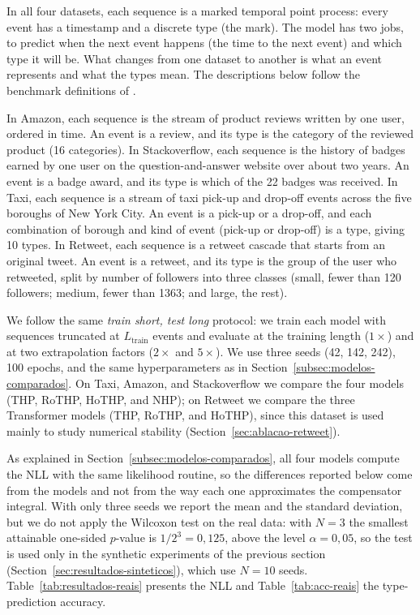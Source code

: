 In all four datasets, each sequence is a marked temporal point process: every event has a timestamp and a discrete type (the mark). The model has two jobs, to predict when the next event happens (the time to the next event) and which type it will be. What changes from one dataset to another is what an event represents and what the types mean. The descriptions below follow the benchmark definitions of \cite{xue_easytpp_2024}.

In Amazon, each sequence is the stream of product reviews written by one user, ordered in time. An event is a review, and its type is the category of the reviewed product (16 categories). In Stackoverflow, each sequence is the history of badges earned by one user on the question-and-answer website over about two years. An event is a badge award, and its type is which of the 22 badges was received. In Taxi, each sequence is a stream of taxi pick-up and drop-off events across the five boroughs of New York City. An event is a pick-up or a drop-off, and each combination of borough and kind of event (pick-up or drop-off) is a type, giving 10 types. In Retweet, each sequence is a retweet cascade that starts from an original tweet. An event is a retweet, and its type is the group of the user who retweeted, split by number of followers into three classes (small, fewer than 120 followers; medium, fewer than 1363; and large, the rest).

We follow the same \textit{train short, test long} protocol: we train each model with sequences truncated at $L_{\text{train}}$ events and evaluate at the training length ($1\times$) and at two extrapolation factors ($2\times$ and $5\times$). We use three seeds (42, 142, 242), 100 epochs, and the same hyperparameters as in Section~\ref{subsec:modelos-comparados}. On Taxi, Amazon, and Stackoverflow we compare the four models (THP, RoTHP, HoTHP, and NHP); on Retweet we compare the three Transformer models (THP, RoTHP, and HoTHP), since this dataset is used mainly to study numerical stability (Section~\ref{sec:ablacao-retweet}).

As explained in Section~\ref{subsec:modelos-comparados}, all four models compute the NLL with the same likelihood routine, so the differences reported below come from the models and not from the way each one approximates the compensator integral. With only three seeds we report the mean and the standard deviation, but we do not apply the Wilcoxon test on the real data: with $N = 3$ the smallest attainable one-sided $p$-value is $1/2^3 = 0{,}125$, above the level $\alpha = 0{,}05$, so the test is used only in the synthetic experiments of the previous section (Section~\ref{sec:resultados-sinteticos}), which use $N = 10$ seeds. Table~\ref{tab:resultados-reais} presents the NLL and Table~\ref{tab:acc-reais} the type-prediction accuracy.

